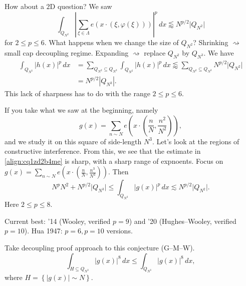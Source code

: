 \documentclass[reqno]{amsart} 
\numberwithin{theorem}{section}
\numberwithin{equation}{section}
\begin{document}
How about a $2$D question?  We saw
\begin{equation*}
  \int_{Q_{N^2}}
  \left\lvert
    \sum_{\xi \in \Lambda}
    e(x \cdot(\xi, \varphi(\xi)))
  \right\rvert^p
  \,d x
  \lessapprox N^{p/2} \lvert Q_{N^2} \rvert
\end{equation*}
for $2 \leq p \leq 6$.  What happens when we change the size of $Q_{N^2}$?
Shrinking $\rightsquigarrow$ small cap decoupling regime.  Expanding $\rightsquigarrow$ replace $Q_{N^2}$ by $Q_{N^3}$.  We have
\begin{align}
  \int_{Q_{N^3}} \lvert h(x) \rvert^p \, d x
  &= \sum_{Q_{N^2} \subseteq Q_{N^3}}\int_{Q_{N^2}} \left\lvert h(x) \right\rvert^p \, d x
    \lessapprox \sum_{Q_{N^2} \subseteq Q_{N^3}} N^{p/2}
    \lvert Q_{N^2} \rvert
    \label{align:cq1zd2b4me}
  \\ \nonumber
  &= N^{p/2}
    \left\lvert Q_{N^3} \right\rvert.
\end{align}
This lack of sharpness has to do with the range $2 \leq p \leq 6$.

If you take what we saw at the beginning, namely
\begin{equation*}
  g(x) = \sum_{n \sim N} e \left( x \cdot \left( \frac{n}{N}, \frac{n^2}{N^2} \right) \right),
\end{equation*}
and we study it on this square of side-length $N^3$.  Let's look at the regions of constructive interference.  From this, we see that the estimate in \eqref{align:cq1zd2b4me} is sharp, with a sharp range of expnoents.  Focus on $g(x) = \sum_{n \sim N} e \left( x \cdot \left( \tfrac{n}{N}, \tfrac{n^3}{N^3} \right) \right)$.
Then
\begin{equation*}
  N^p N^2 + N^{p/2} \lvert Q_{N^3} \rvert \leq \int_{Q_{N^3}} \lvert g(x) \rvert^p
  \, d x
  \lesssim N^{p/2} \lvert Q_{N^2} \rvert.
\end{equation*}
Here $2 \leq p \leq 8$.

Current best: '14 (Wooley, verified $p = 9$) and '20 (Hughes--Wooley, verified $p = 10$).  Hua 1947: $p = 6, p = 10$ versions.

Take decoupling proof approach to this conjecture (G--M--W).
\begin{equation*}
  \int_{H \subseteq Q_{N^3}} \lvert g(x) \rvert^8 \, d x
  \leq \int_{Q_{N^3}} \left\lvert g(x) \right\rvert^8 \, d x,
\end{equation*}
where $H = \left\{ \lvert g(x) \rvert \sim N \right\}$.
\end{document}
